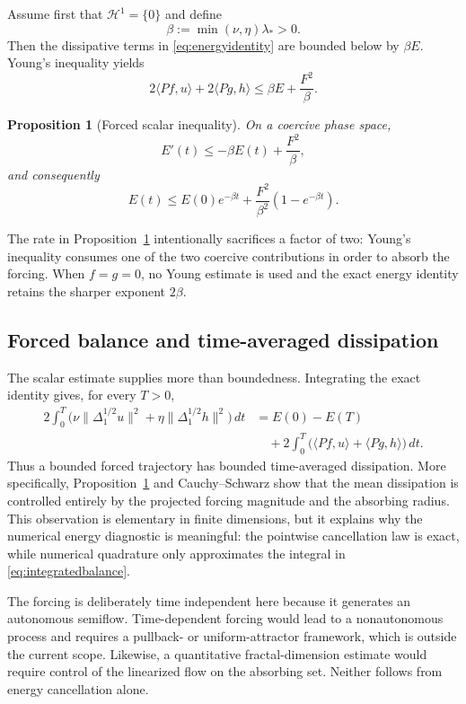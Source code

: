 \documentclass[11pt]{article}
\newtheorem{proposition}{Proposition}
\theoremstyle{remark}
\begin{document}
Assume first that $\mathcal H^1=\{0\}$ and define
\[
\beta:=\min(\nu,\eta)\lambda_*>0.
\]
Then the dissipative terms in \eqref{eq:energyidentity} are bounded below by $\beta E$. Young's inequality yields
\[
2\langle Pf,u\rangle+2\langle Pg,h\rangle
\leq\beta E+\frac{F^2}{\beta}.
\]

\begin{proposition}[Forced scalar inequality]\label{prop:scalar}
On a coercive phase space,
\begin{equation}
E'(t)\leq-\beta E(t)+\frac{F^2}{\beta},
\label{eq:scalarineq}
\end{equation}
and consequently
\begin{equation}
E(t)\leq E(0)e^{-\beta t}+\frac{F^2}{\beta^2}(1-e^{-\beta t}).
\label{eq:forcedbound}
\end{equation}
\end{proposition}

The rate in Proposition~\ref{prop:scalar} intentionally sacrifices a factor of two: Young's inequality consumes one of the two coercive contributions in order to absorb the forcing. When $f=g=0$, no Young estimate is used and the exact energy identity retains the sharper exponent $2\beta$.

\subsection{Forced balance and time-averaged dissipation}

The scalar estimate supplies more than boundedness. Integrating the exact identity gives, for every $T>0$,
\begin{align}
2\int_0^T\bigl(\nu\|\Delta_1^{1/2}u\|^2+\eta\|\Delta_1^{1/2}h\|^2\bigr)\,dt
&=E(0)-E(T)\\
&\quad+2\int_0^T\bigl(\langle Pf,u\rangle+\langle Pg,h\rangle\bigr)\,dt.
\label{eq:integratedbalance}
\end{align}
Thus a bounded forced trajectory has bounded time-averaged dissipation. More specifically, Proposition~\ref{prop:scalar} and Cauchy--Schwarz show that the mean dissipation is controlled entirely by the projected forcing magnitude and the absorbing radius. This observation is elementary in finite dimensions, but it explains why the numerical energy diagnostic is meaningful: the pointwise cancellation law is exact, while numerical quadrature only approximates the integral in \eqref{eq:integratedbalance}.

The forcing is deliberately time independent here because it generates an autonomous semiflow. Time-dependent forcing would lead to a nonautonomous process and requires a pullback- or uniform-attractor framework, which is outside the current scope. Likewise, a quantitative fractal-dimension estimate would require control of the linearized flow on the absorbing set. Neither follows from energy cancellation alone.
\end{document}
